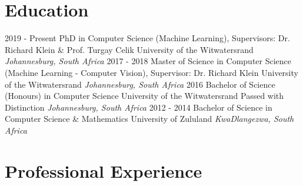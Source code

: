 \documentclass[letterpaper]{moderncv}        %
\begin{document}
\makecvtitle

%

\section{Education}
\cventry
{2019 - Present}
{PhD in Computer Science (Machine Learning), Supervisors: Dr. Richard Klein \& Prof. Turgay Celik}
{University of the Witwatersrand}
{}
{\textit{Johannesburg, South Africa}}
{}
\cventry
{2017 - 2018}
{Master of Science in Computer Science (Machine Learning - Computer Vision), Supervisor: Dr. Richard Klein}
{University of the Witwatersrand}
{}
{\textit{Johannesburg, South Africa}}
{}
\cventry
{2016}
{Bachelor of Science (Honours) in Computer Science}
{University of the Witwatersrand}
{Passed with Distinction}
{\textit{Johannesburg, South Africa}}
{}
\cventry
{2012 - 2014}
{Bachelor of Science in Computer Science \& Mathematics}
{University of Zululand}
{}
{\textit{KwaDlangezwa, South Africa}}
{}
\section{Professional Experience}
\end{document}
